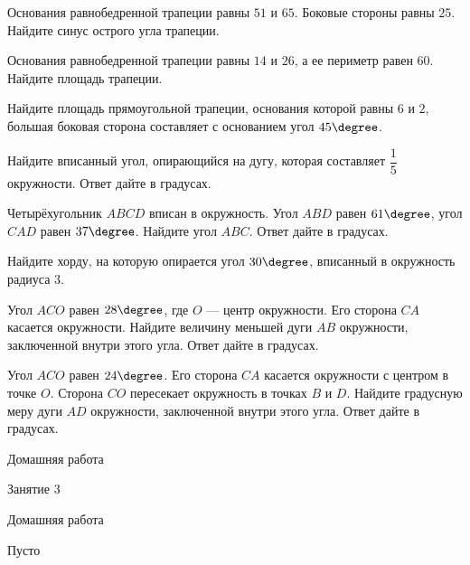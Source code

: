 \begin{class}[number=2]
\begin{listofex}
		\item Основания равнобедренной трапеции равны \( 51 \) и \( 65 \). Боковые стороны равны \( 25 \). Найдите синус острого угла трапеции.
		\item Основания равнобедренной трапеции равны \( 14 \) и \( 26 \), а ее периметр равен \( 60 \). Найдите площадь трапеции.
		\item Найдите площадь прямоугольной трапеции, основания которой равны \( 6 \) и \( 2 \), большая боковая сторона составляет с основанием угол \( 45\degree \).
		\item Найдите вписанный угол, опирающийся на дугу, которая составляет \( \dfrac{1}{5} \) окружности. Ответ дайте в градусах.
		\item Четырёхугольник \( ABCD \) вписан в окружность. Угол \( ABD \) равен \( 61\degree \), угол \( CAD \) равен \( 37\degree \). Найдите угол \( ABC \). Ответ дайте в градусах.
		\item Найдите хорду, на которую опирается угол \( 30\degree \), вписанный в окружность радиуса \( 3 \).
		\item Угол \( ACO \) равен \( 28\degree \), где \( O \) --- центр окружности. Его сторона \( CA \) касается окружности. Найдите величину меньшей дуги \( AB \) окружности, заключенной внутри этого угла. Ответ дайте в градусах.
		\item Угол \( ACO \) равен \( 24\degree \). Его сторона \( CA \) касается окружности с центром в точке \( O \). Сторона \( CO \) пересекает окружность в точках \( B \) и \( D \). Найдите градусную меру дуги \( AD \) окружности, заключенной внутри этого угла. Ответ дайте в градусах.
	\end{listofex}
\end{class}

\begin{homework}[number=2]
	\begin{listofex}
		\item Домашняя работа
	\end{listofex}
\end{homework}

\begin{class}[number=3]
	\begin{listofex}
		\item Занятие 3
	\end{listofex}
\end{class}

\begin{homework}[number=3]
	\begin{listofex}
		\item Домашняя работа
	\end{listofex}
\end{homework}

\begin{class}[number=4]
	\begin{listofex}
		\item Пусто
	\end{listofex}
\end{class}
